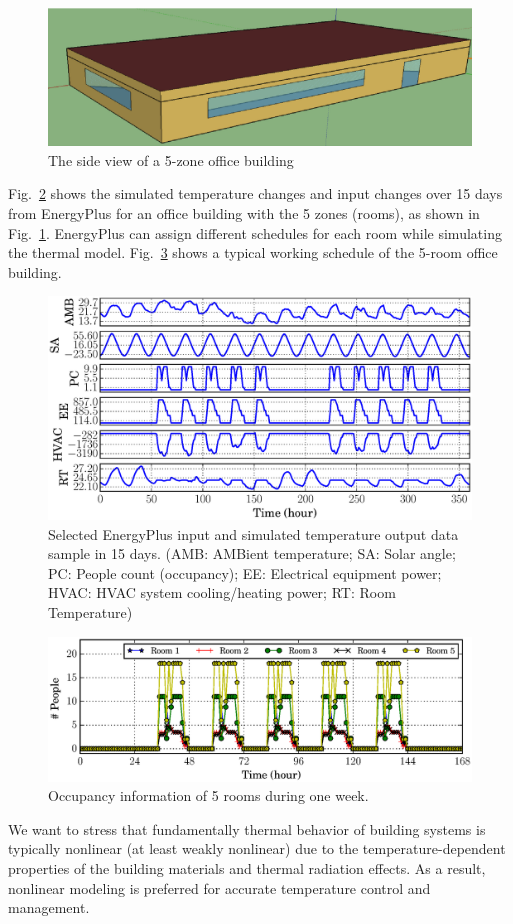 \begin{figure}[t]
    \centering
    \includegraphics[width=0.7\columnwidth]{figs/energyplus_review/5zone-a}
    \caption{The side view of a 5-zone office building}
    \label{fig:5zone}
\end{figure}

Fig.~\ref{fig:energyplus-io-curve} shows the simulated temperature changes and
input changes over 15 days from EnergyPlus for an office building with the 5 zones
(rooms), as shown in Fig.~\ref{fig:5zone}. EnergyPlus can assign different schedules
for each room while simulating the thermal model.
Fig.~\ref{fig:occupancy-curve} shows a typical working schedule of the 5-room
office building.

\begin{figure}[t]
    \includegraphics[width=0.9\columnwidth]{figs/energyplus_review/energyplus}
    \caption{Selected EnergyPlus input and simulated temperature output data sample in
        15 days.  (AMB: AMBient temperature; SA: Solar angle; PC: People count
        (occupancy); EE: Electrical equipment power; HVAC: HVAC system
        cooling/heating power; RT: Room Temperature)}
    \label{fig:energyplus-io-curve}
\end{figure}
\begin{figure}[t]
\centering
\includegraphics[width=0.9\columnwidth]{figs/energyplus_review/occupancy}
\caption{Occupancy information of 5 rooms during one week.}
\label{fig:occupancy-curve}
\end{figure}

We want to stress that fundamentally thermal behavior of building
systems is typically nonlinear (at least weakly nonlinear) due to the
temperature-dependent properties of the building materials and thermal
radiation effects. As a result, nonlinear modeling is preferred for accurate temperature
control and management.

